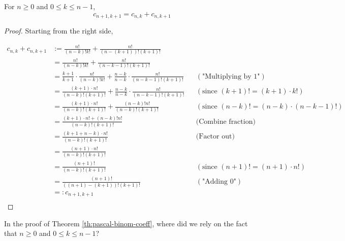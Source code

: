 \begin{theorem} 
\label{th:pascal-binom-coeff}
For $n \geq 0$ and $0 \leq k \leq n-1$, 
\begin{equation}
c_{n+1,k+1} = c_{n,k} + c_{n,k+1}
\end{equation} 

\end{theorem}
\begin{proof}
Starting from the right side, 

\begin{align*}
c_{n,k} + c_{n,k+1} &:= \frac{n!}{(n-k)! k!} + \frac{n!}{(n-(k+1))! (k+1)!} \\
&= \frac{n!}{(n-k)! k!} + \frac{n!}{(n-k-1)! (k+1)!} \\
&= \frac{k+1}{k+1} \cdot \frac{n!}{(n-k)! k!} + \frac{n-k}{n-k} \cdot \frac{n!}{(n-k-1)! (k+1)!} && (\text{"Multiplying by 1"}) \\
&= \frac{ (k+1) \cdot n!}{(n-k)! (k+1)!} + \frac{n-k}{n-k} \cdot \frac{n!}{(n-k-1)! (k+1)!} && (\text{since $(k+1)! = (k+1) \cdot k!$}) \\
&= \frac{ (k+1) \cdot n!}{(n-k)! (k+1)!} + \frac{(n-k)! n!}{(n-k)! (k+1)!} && (\text{since $(n-k)! = (n-k) \cdot (n-k-1)!$}) \\
&= \frac{ (k+1) \cdot n! + (n-k)! n!}{(n-k)! (k+1)!} && \text{(Combine fraction)}\\
&= \frac{ (k+1 + n-k) \cdot n!}{(n-k)! (k+1)!} && \text{(Factor out)}\\
&= \frac{ (n+1) \cdot n!}{(n-k)! (k+1)!} \\
&= \frac{ (n+1)!}{(n-k)! (k+1)!} && (\text{since $(n+1)! = (n+1) \cdot n!$}) \\
&= \frac{ (n+1)!}{((n+1)-(k+1))! (k+1)!} && (\text{"Adding 0"}) \\
&=: c_{n+1,k+1}\\
\end{align*}

\end{proof}



\begin{exercise}
In the proof of Theorem \ref{th:pascal-binom-coeff}, where did we rely on the fact that $n \geq 0$ and $0 \leq k \leq n-1$?
\end{exercise}


